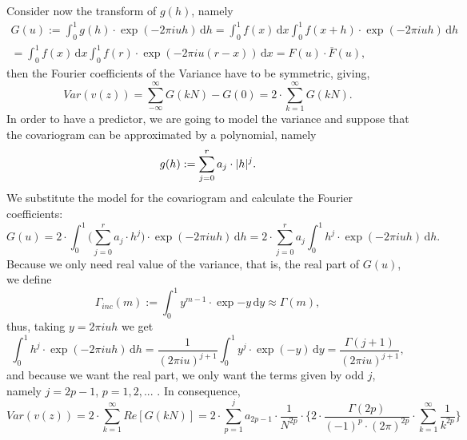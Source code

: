 Consider now the transform of $g(h)$, namely
\begin{multline*}
    G(u) := \int_{0}^{1} g(h) \cdot \exp{(-2\pi i u h)} \,\mathrm{d}h = \int_{0}^{1} f(x) \,\mathrm{d}x \int_{0}^{1} f(x+h) \cdot \exp{(-2\pi i u h)} \,\mathrm{d}h \\
    = \int_{0}^{1} f(x) \,\mathrm{d}x \int_{0}^{1} f(r) \cdot \exp{(-2\pi i u (r-x))} \,\mathrm{d}x = F(u) \cdot \overline{F}(u),
\end{multline*}
then the Fourier coefficients of the Variance have to be symmetric, giving,
\begin{equation*}
    Var(v(z)) = \sum_{-\infty}^{\infty} G\left( k N \right) - G(0) = 2\cdot \sum_{k=1}^{\infty} G\left( k N \right).
\end{equation*}
In order to have a predictor, we are going to model the variance and suppose that the covariogram can be approximated by a polynomial, namely
\begin{equation*}
    g(h) := \sum_{j=0}^{r} a_j \cdot \lvert h\rvert^j.
\end{equation*}
We substitute the model for the covariogram and calculate the Fourier coefficients: 
\begin{equation*}
    G(u) = 2\cdot \int_0^{1} \bigg( \sum_{j=0}^r a_j \cdot h^j \bigg) \cdot \exp{(-2\pi i u h)} \,\mathrm{d}h = 2\cdot \sum_{j=0}^r a_j \int_{0}^{1} h^j \cdot \exp{(-2\pi i u h)} \,\mathrm{d}h.
\end{equation*}
Because we only need real value of the variance, 
that is, the real part of $G(u)$, we define
\begin{equation*}
    \Gamma_{inc} (m) := \int_0^{1} y^{m-1} \cdot \exp{-y} \,\mathrm{d}y \approx \Gamma (m),
\end{equation*}
thus, taking $y=2\pi i u h$ we get
\begin{equation*}
    \int_{0}^{1} h^j \cdot \exp{(-2\pi i u h)} \,\mathrm{d}h = \frac{1}{(2\pi i u)^{j+1}} \int_0^{1} y^j \cdot \exp{(-y)} \,\mathrm{d}y = \frac{\Gamma (j+1)}{(2\pi i u)^{j+1}},
\end{equation*}
and because we want the real part, we only want the terms given by odd $j$, namely $j=2p-1$, $p=1,2,...$ . In consequence,
\begin{equation*}
    Var(v(z)) = 2\cdot \sum_{k=1}^{\infty} Re\left[G\left( k N \right)\right] = 2\cdot \sum_{p=1}^j a_{2p-1} \cdot \frac{1}{N^{2p}} \cdot \Bigg\{ 2\cdot \frac{\Gamma (2p)}{(-1)^p \cdot (2\pi)^{2p}} \cdot \sum_{k=1}^{\infty} \frac{1}{k^{2p}} \Bigg\}
\end{equation*}

